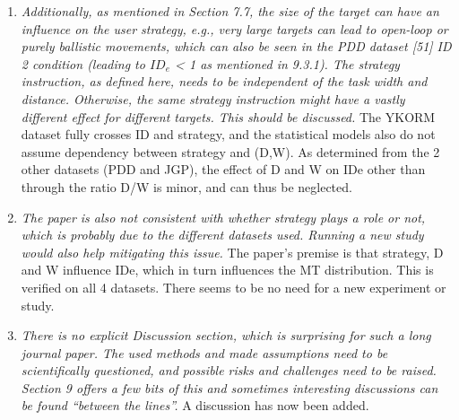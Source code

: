 \documentclass{article}
\begin{document}
\begin{enumerate}
    Some examples include: In the YKORM dataset all participants first performed the balanced blocks, the remaining two groups of blocks (speed or accuracy) were counterbalanced across participants. In \textbf{Zhang, Mingrui Ray, Shumin Zhai, and Jacob O. Wobbrock. "Text entry throughput: Towards unifying speed and accuracy in a single performance metric." Proceedings of the 2019 CHI conference on human factors in computing systems. 2019.}, all participants ended with the balanced block, and fast /extra fast were balanced with accurate, extra accurate. The GO dataset is an exception in that strategies were not contiguous, and changed at each block, but following the order (and in reverse) of the ordinal scale of strategy. The impact of improper counterbalancing is likely an inflated range of IDe values, and has likely litte bearing on the MT distribution itself.
    \item \textit{Additionally, as mentioned in Section 7.7, the size of the target can have an influence on the user strategy, e.g., very large targets can lead to open-loop or purely ballistic movements, which can also be seen in the PDD dataset [51] ID 2 condition (leading to $ID_e$ < 1 as mentioned in 9.3.1). The strategy instruction, as defined here, needs to be independent of the task width and distance. Otherwise, the same strategy instruction might have a vastly different effect for different targets. This should be discussed.} The YKORM dataset fully crosses ID and strategy, and the statistical models also do not assume dependency between strategy and (D,W). As determined from the 2 other datasets (PDD and JGP), the effect of D and W on IDe other than through the ratio D/W is minor, and can thus be neglected. 
    \item \textit{The paper is also not consistent with whether strategy plays a role or not, which is probably due to the different datasets used. Running a new study would also help mitigating this issue.} The paper's premise is that strategy, D and W influence IDe, which in turn influences the MT distribution. This is verified on all 4 datasets. There seems to be no need for a new experiment or study.
    \item \textit{There is no explicit Discussion section, which is surprising for such a long journal paper. The used methods and made assumptions need to be scientifically questioned, and possible risks and challenges need to be raised. Section 9 offers a few bits of this and sometimes interesting discussions can be found “between the lines”. } A discussion has now been added.

\end{enumerate}
\end{document}
